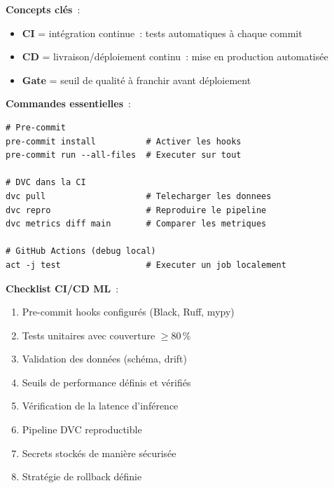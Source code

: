 \begin{cheatsheet}[title=\textbf{CI/CD pour le Machine Learning}]
\textbf{Concepts cl\'es}~:
\begin{itemize}
    \item \textbf{CI} = int\'egration continue~: tests automatiques \`a chaque commit
    \item \textbf{CD} = livraison/d\'eploiement continu~: mise en production automatis\'ee
    \item \textbf{Gate} = seuil de qualit\'e \`a franchir avant d\'eploiement
\end{itemize}

\textbf{Commandes essentielles}~:
\begin{verbatim}
# Pre-commit
pre-commit install          # Activer les hooks
pre-commit run --all-files  # Executer sur tout

# DVC dans la CI
dvc pull                    # Telecharger les donnees
dvc repro                   # Reproduire le pipeline
dvc metrics diff main       # Comparer les metriques

# GitHub Actions (debug local)
act -j test                 # Executer un job localement
\end{verbatim}

\textbf{Checklist CI/CD ML}~:
\begin{enumerate}
    \item[$\square$] Pre-commit hooks configur\'es (Black, Ruff, mypy)
    \item[$\square$] Tests unitaires avec couverture $\geq 80\,\%$
    \item[$\square$] Validation des donn\'ees (sch\'ema, drift)
    \item[$\square$] Seuils de performance d\'efinis et v\'erifi\'es
    \item[$\square$] V\'erification de la latence d'inf\'erence
    \item[$\square$] Pipeline DVC reproductible
    \item[$\square$] Secrets stock\'es de mani\`ere s\'ecuris\'ee
    \item[$\square$] Strat\'egie de rollback d\'efinie
\end{enumerate}
\end{cheatsheet}

